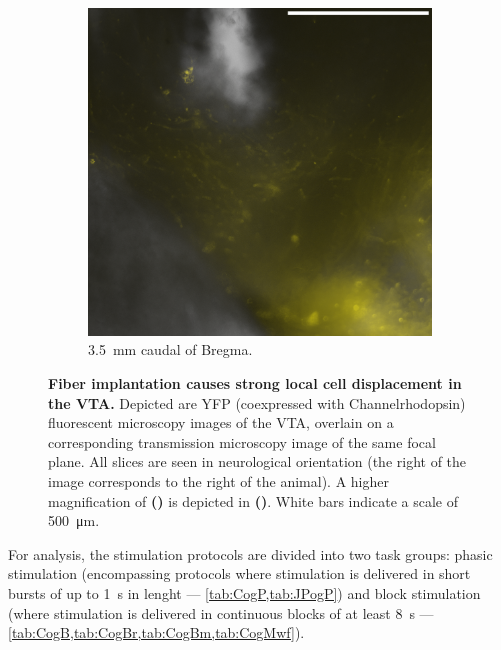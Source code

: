 \begin{figure}[h!]
\begin{subfigure}{.43\textwidth}
		\label{fig:h6589}
	\end{subfigure}
	\begin{subfigure}{.2728\textwidth}
		\centering
		\includegraphics[width=\textwidth]{img/sub-6589_slice-a4_zoom-10_scene-2_transmission-yfp-comb_straight.png}
                \caption{\SI{3.5}{\milli\meter} caudal of Bregma.}
		\label{fig:h6589z}
	\end{subfigure}
        \vspace{-.5em}
	\caption{
		\textbf{Fiber implantation causes strong local cell displacement in the VTA.}
                Depicted are YFP (coexpressed with Channelrhodopsin) fluorescent microscopy images of the VTA, overlain on a corresponding transmission microscopy image of the same focal plane.
                All slices are seen in neurological orientation (the right of the image corresponds to the right of the animal).
                A higher magnification of \textbf{()} is depicted in \textbf{()}.
                White bars indicate a scale of \SI{500}{\micro\meter}.
                }
	\label{fig:h}
\end{figure}

For analysis, the stimulation protocols are divided into two task groups: phasic stimulation (encompassing protocols where stimulation is delivered in short bursts of up to \SI{1}{\second} in lenght --- \cref{tab:CogP,tab:JPogP}) and block stimulation (where stimulation is delivered in continuous blocks of at least \SI{8}{\second} --- \cref{tab:CogB,tab:CogBr,tab:CogBm,tab:CogMwf}).

